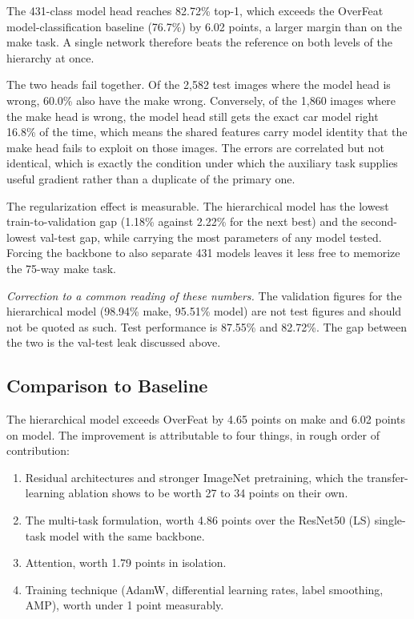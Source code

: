 The 431-class model head reaches 82.72\% top-1, which exceeds the OverFeat model-classification baseline (76.7\%) by 6.02 points, a larger margin than on the make task. A single network therefore beats the reference on both levels of the hierarchy at once.

The two heads fail together. Of the 2,582 test images where the model head is wrong, 60.0\% also have the make wrong. Conversely, of the 1,860 images where the make head is wrong, the model head still gets the exact car model right 16.8\% of the time, which means the shared features carry model identity that the make head fails to exploit on those images. The errors are correlated but not identical, which is exactly the condition under which the auxiliary task supplies useful gradient rather than a duplicate of the primary one.

The regularization effect is measurable. The hierarchical model has the lowest train-to-validation gap (1.18\% against 2.22\% for the next best) and the second-lowest val-test gap, while carrying the most parameters of any model tested. Forcing the backbone to also separate 431 models leaves it less free to memorize the 75-way make task.

\emph{Correction to a common reading of these numbers.} The validation figures for the hierarchical model (98.94\% make, 95.51\% model) are not test figures and should not be quoted as such. Test performance is 87.55\% and 82.72\%. The gap between the two is the val-test leak discussed above.

\subsection{Comparison to Baseline}

The hierarchical model exceeds OverFeat by 4.65 points on make and 6.02 points on model. The improvement is attributable to four things, in rough order of contribution:

\begin{enumerate}
    \item Residual architectures and stronger ImageNet pretraining, which the transfer-learning ablation shows to be worth 27 to 34 points on their own.
    \item The multi-task formulation, worth 4.86 points over the ResNet50 (LS) single-task model with the same backbone.
    \item Attention, worth 1.79 points in isolation.
    \item Training technique (AdamW, differential learning rates, label smoothing, AMP), worth under 1 point measurably.
\end{enumerate}
